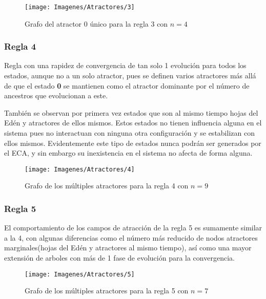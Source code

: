 \documentclass[]{article}
\begin{document}
				\hfill\break
				\hfill\break
				\hfill\break
				\hfill\break
				\hfill\break
				\begin{figure}[!h]
					\centering
					\texttt{[image: Imagenes/Atractores/3]}
					\caption{Grafo del atractor 0 único para la regla 3 con $n=4$}
					\label{Regla_3}
				\end{figure}
			
			
			\newpage
			\subsubsection{Regla 4}
				\justifying
				Regla con una rapidez de convergencia de tan solo 1 evolución para todos los estados, aunque no a un solo atractor, pues se definen varios atractores más allá de que el estado \textbf{0} se mantienen como el atractor dominante por el número de ancestros que evolucionan a este.
				
				\hfill\break
				\justifying
				También se observan por primera vez estados que son al mismo tiempo hojas del Edén y atractores de ellos mismos. Estos estados no tienen influencia alguna en el sistema pues no interactuan con ninguna otra configuración y se estabilizan con ellos mismos. Evidentemente este tipo de estados nunca podrán ser generados por el ECA, y sin embargo su inexistencia en el sistema no afecta de forma alguna.
			
				\hfill\break
				\begin{figure}[!h]
					\centering
					\texttt{[image: Imagenes/Atractores/4]}
					\caption{Grafo de los múltiples atractores para la regla 4 con $n=9$}
					\label{Regla_4}
				\end{figure}
			
			
			\newpage
			\subsubsection{Regla 5}
				\justifying
				El comportamiento de los campos de atracción de la regla 5 es sumamente similar a la 4, con algunas diferencias como el número más reducido de nodos atractores marginales(hojas del Edén y atractores al mismo tiempo), así como una mayor extensión de arboles con más de 1 fase de evolución para la convergencia.
				
				
				\hfill\break
				\hfill\break
				\hfill\break
				\hfill\break
				\hfill\break
				\begin{figure}[!h]
					\centering
					\texttt{[image: Imagenes/Atractores/5]}
					\caption{Grafo de los múltiples atractores para la regla 5 con $n=7$}
					\label{Regla_5}
				\end{figure}
			
\end{document}

